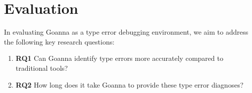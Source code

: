 \documentclass[pdflatex,sn-mathphys-num]{sn-jnl}%
\begin{document}
    
    
       
\section{Evaluation} \label{sec:evaluation}

In evaluating Goanna as a type error debugging environment, we aim to address the following key research questions:

\begin{enumerate}
    \item \textbf{RQ1} Can Goanna identify type errors more accurately compared to traditional tools?
    \item \textbf{RQ2} How long does it take Goanna to provide these type error diagnoses?
\end{enumerate}
\end{document}
